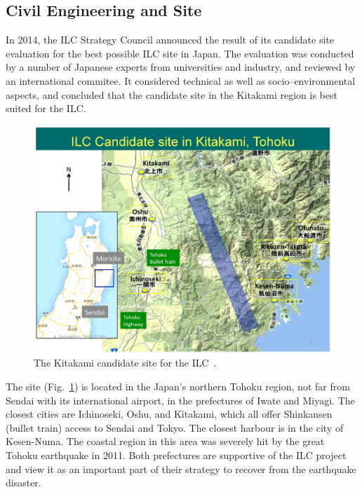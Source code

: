 
\subsection{Civil Engineering and Site}


In 2014, the ILC Strategy Council announced the result of its candidate site evaluation for the best possible ILC site in Japan\cite{ILCSC:2014a}.
The evaluation was conducted by a number of Japanese experts from universities and industry, and reviewed by an international commitee. 
It considered technical as well as socio--environmental aspects, and concluded that the candidate site in the Kitakami region is best suited for the ILC.

\begin{figure}[htbp]
   \includegraphics[width=\hsize]{chapters/figures/ILC-Candidate-Area2}
\caption{The Kitakami candidate site for the ILC~\cite{Warmbein:2014a}.}
\label{fig:kitakami-site}
\end{figure}

The site (Fig.~\ref{fig:kitakami-site}) is located in the Japan's northern Tohoku region, not far from Sendai with its international airport, in the prefectures of Iwate and Miyagi.
The closest cities are Ichinoseki, Oshu, and Kitakami, which all offer Shinkansen (bullet train) access to Sendai and Tokyo.
The closest harbour is in the city of Kesen-Numa.
The coastal region in this area was severely hit by the great Tohoku earthquake in 2011. 
Both prefectures are supportive of the ILC project and view it as an important part of their strategy to recover from the earthquake disaster.

